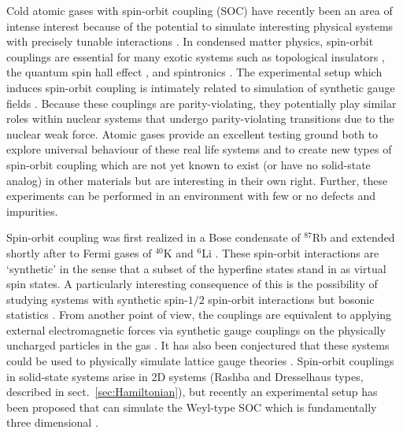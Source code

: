 \documentclass[%
 onecolumn,
 notitlepage,
 amsmath,amssymb,
 aps,
]{revtex4-1}
\begin{document}
Cold atomic gases with spin-orbit coupling (SOC) have recently been an area of intense interest because of the potential to simulate interesting physical systems with precisely tunable interactions \cite{nature11841}. In condensed matter physics, spin-orbit couplings are essential for many exotic systems such as topological insulators \cite{das2013engineering,PhysRevLett.105.255302}, the quantum spin hall effect \cite{nature12185}, and spintronics \cite{RevModPhys.76.323}. The experimental setup which induces spin-orbit coupling is intimately related to simulation of synthetic gauge fields \cite{RevModPhys.83.1523,hamner2014dicke,Lin:2009zzb,Bermudez:2011db}. Because these couplings are parity-violating, they potentially play similar roles within nuclear systems that undergo parity-violating transitions due to the nuclear weak force.  Atomic gases provide an excellent testing ground both to explore universal behaviour of these real life systems and to create new types of spin-orbit coupling which are not yet known to exist (or have no solid-state analog) in other materials but are interesting in their own right. Further, these experiments can be performed in an environment with few or no defects and impurities.

Spin-orbit coupling was first realized in a Bose condensate of $^{87}$Rb \cite{nature09887} and extended shortly after to Fermi gases of $^{40}$K \cite{PhysRevLett.109.095301} and $^6$Li \cite{PhysRevLett.109.095302}. These spin-orbit interactions are `synthetic' in the sense that a subset of the hyperfine states stand in as virtual spin states. A particularly interesting consequence of this is the possibility of studying systems with synthetic spin-$1/2$ spin-orbit interactions but bosonic statistics \cite{PhysRevA.68.063612,nature09887}. From another point of view, the couplings are equivalent to applying external electromagnetic forces via synthetic gauge couplings on the physically uncharged particles in the gas \cite{Lin:2011,PhysRevLett.107.255301}. It has also been conjectured that these systems could be used to physically simulate lattice gauge theories \cite{Bermudez:2010da,Mazza:2011kf}.  Spin-orbit couplings in solid-state systems arise in 2D systems (Rashba and Dresselhaus types, described in sect.~\ref{sec:Hamiltonian}), but recently an experimental setup has been proposed that can simulate the Weyl-type SOC which is fundamentally three dimensional \cite{PhysRevLett.108.235301}.
\end{document}
